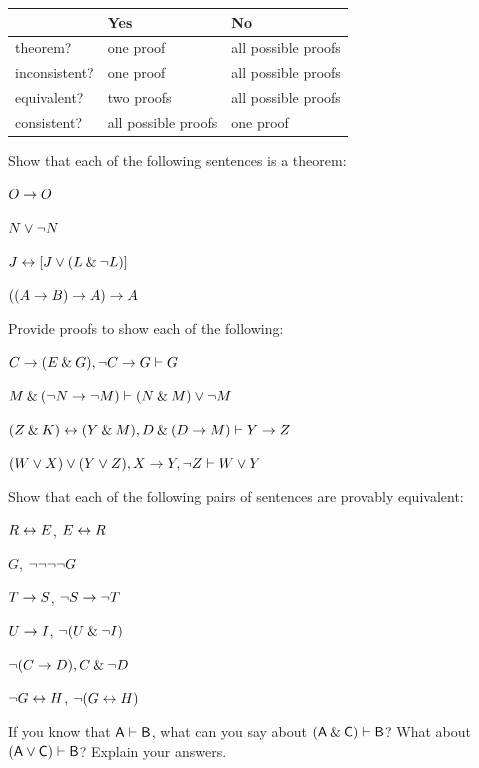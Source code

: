 \begin{center}
\begin{tabular}{l l l}
 & \textbf{Yes} & \textbf{No}\\
 \hline
theorem? & one proof & all possible proofs\\
inconsistent? &  one proof  & all possible proofs\\
equivalent? & two proofs & all possible proofs\\
consistent? & all possible proofs & one proof\\
\end{tabular}
\end{center}


\practiceproblems
\problempart
Show that each of the following sentences is a theorem:
\begin{earg}
\item $O \rightarrow O$
\item $N \vee {\neg} N$
\item $J \leftrightarrow [J\vee (L\mathbin{\&}{\neg} L)]$
\item $((A \rightarrow B) \rightarrow A) \rightarrow A$ 
\end{earg}

\problempart
Provide proofs to show each of the following:
\begin{earg}
\item $C\rightarrow(E\mathbin{\&} G), {\neg} C \rightarrow G \vdash G$
\item $M \mathbin{\&} ({\neg} N \rightarrow {\neg} M) \vdash (N \mathbin{\&} M) \vee {\neg} M$
\item $(Z\mathbin{\&} K)\leftrightarrow(Y\mathbin{\&} M), D\mathbin{\&}(D\rightarrow M) \vdash Y\rightarrow Z$
\item $(W \vee X) \vee (Y \vee Z), X\rightarrow Y, {\neg} Z \vdash W\vee Y$
\end{earg}

\problempart
Show that each of the following pairs of sentences are provably equivalent:
\begin{earg}
\item $R \leftrightarrow E$, $E \leftrightarrow R$
\item $G$, ${\neg}{\neg}{\neg}{\neg} G$
\item $T\rightarrow S$, ${\neg} S \rightarrow {\neg} T$
\item $U \rightarrow I$, ${\neg}(U \mathbin{\&} {\neg} I)$
\item ${\neg} (C \rightarrow D), C \mathbin{\&} {\neg} D$
\item ${\neg} G \leftrightarrow H$, ${\neg}(G \leftrightarrow H)$ 
\end{earg}

\problempart
If you know that $\mathsf{A}\vdash\mathsf{B}$, what can you say about $(\mathsf{A}\mathbin{\&}\mathsf{C})\vdash\mathsf{B}$? What about $(\mathsf{A}\vee\mathsf{C})\vdash\mathsf{B}$? Explain your answers.

